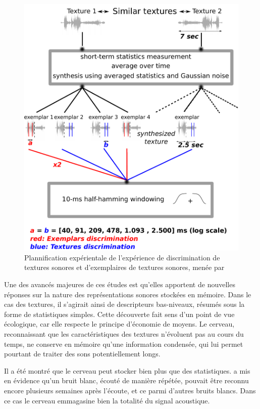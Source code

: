 \begin{figure}[bth]
        \myfloatalign
        \includegraphics[width=\linewidth]{gfx/mcder}
        \caption[Plannification expérientale de l'expérience de discrimination de textures sonores et d'exemplaires de textures sonores]{Plannification expérientale de l'expérience de discrimination de textures sonores et d'exemplaires de textures sonores, menée par \citep{mcdermott2013summary}}\label{fig:textureMcder}
\end{figure}

Une des avancés majeures de ces études est qu'elles apportent de nouvelles réponses sur la nature des représentations sonores stockées en mémoire. Dans le cas des textures, il s'agirait ainsi de descripteurs bas-niveaux, résumés sous la forme de statistiques simples. Cette découverte fait sens d'un point de vue écologique, car elle respecte le principe d'économie de moyens. Le cerveau, reconnaissant que les caractéristiques des textures n'évoluent pas au cours du temps, ne conserve en mémoire qu'une information condensée, qui lui permet pourtant de traiter des sons potentiellement longs. 

Il a été montré que le cerveau peut stocker bien plus que des statistiques. \citep{agus2010rapid} a mis en évidence qu'un bruit blanc, écouté de manière répétée, pouvait être reconnu encore plusieurs semaines après l'écoute, et ce parmi d'autres bruits blancs. Dans ce cas le cerveau emmagasine bien la totalité du signal acoustique.

